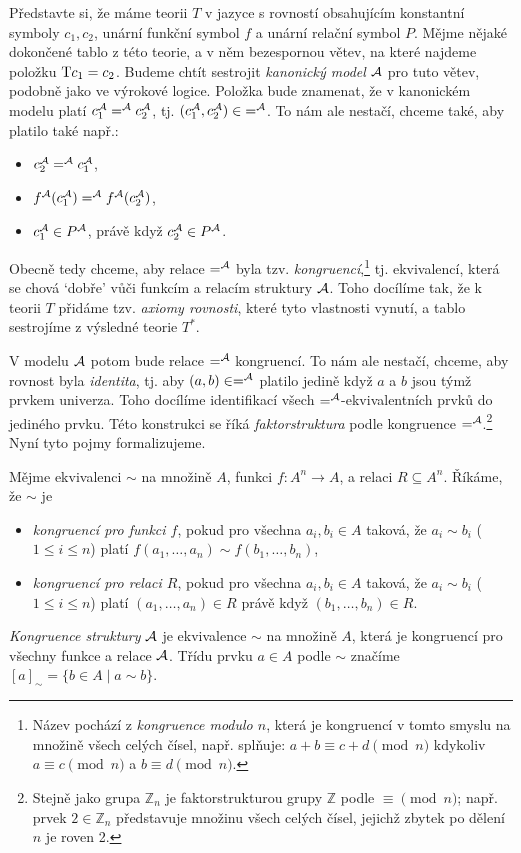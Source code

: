 Představte si, že máme teorii $T$ v jazyce s rovností obsahujícím konstantní symboly $c_1,c_2$, unární funkční symbol $f$ a unární relační symbol $P$. Mějme nějaké dokončené tablo z této teorie, a v něm bezespornou větev, na které najdeme položku $\mathrm{T} c_1=c_2$. Budeme chtít sestrojit \emph{kanonický model} $\mathcal{A}$ pro tuto větev, podobně jako ve výrokové logice. Položka bude znamenat, že v kanonickém modelu platí $c_1^{\mathcal{A}} =^{\mathcal{A}} c_2^{\mathcal{A}}$, tj. $(c_1^{\mathcal{A}},c_2^{\mathcal{A}})\in {=^{\mathcal{A}}}$. To nám ale nestačí, chceme také, aby platilo také např.:
\begin{itemize}
    \item $c_2^{\mathcal{A}} =^{\mathcal{A}} c_1^{\mathcal{A}}$,
    \item $f^{\mathcal{A}}(c_1^{\mathcal{A}}) =^{\mathcal{A}} f^{\mathcal{A}}(c_2^{\mathcal{A}})$,
    \item $c_1^{\mathcal{A}}\in P^{\mathcal{A}}$, právě když $c_2^{\mathcal{A}}\in P^{\mathcal{A}}$.
\end{itemize}
Obecně tedy chceme, aby relace $=^{\mathcal{A}}$ byla tzv. \emph{kongruencí},\footnote{Název pochází z \emph{kongruence modulo $n$}, která je kongruencí v tomto smyslu na množině všech celých čísel, např. splňuje: $a+b\equiv c+d\pmod n$ kdykoliv $a\equiv c\pmod n$ a $b\equiv d\pmod n$.} tj. ekvivalencí, která se chová `dobře' vůči funkcím a relacím struktury $\mathcal{A}$. Toho docílíme tak, že k teorii $T$ přidáme tzv. \emph{axiomy rovnosti}, které tyto vlastnosti vynutí, a tablo sestrojíme z výsledné teorie $T^*$.

V modelu $\mathcal{A}$ potom bude relace $=^{\mathcal{A}}$ kongruencí. To nám ale nestačí, chceme, aby rovnost byla \emph{identita}, tj. aby $(a,b)\in=^{\mathcal{A}}$ platilo jedině když $a$ a $b$ jsou týmž prvkem univerza. Toho docílíme identifikací všech $=^{\mathcal{A}}$-ekvivalentních prvků do jediného prvku. Této konstrukci se říká \emph{faktorstruktura} podle kongruence $=^{\mathcal{A}}$.\footnote{Stejně jako grupa $\mathbb Z_n$ je faktorstrukturou grupy $\mathbb Z$ podle $\equiv\pmod n$; např. prvek $2\in\mathbb Z_n$ představuje množinu všech celých čísel, jejichž zbytek po dělení $n$ je roven 2.} Nyní tyto pojmy formalizujeme.

\begin{definition}[Kongruence]
    Mějme ekvivalenci $\sim$ na množině $A$, funkci $f\colon A^n\to A$, a relaci $R\subseteq A^n$. Říkáme, že $\sim$ je
    \begin{itemize}
        \item \emph{kongruencí pro funkci $f$}, pokud pro všechna $a_i,b_i\in A$ taková, že $a_i\sim b_i$ ($1\leq i\leq n$) platí $f(a_1,\dots,a_n)\sim f(b_1,\dots,b_n)$,
        \item \emph{kongruencí pro relaci $R$}, pokud pro všechna $a_i,b_i\in A$ taková, že $a_i\sim b_i$ ($1\leq i\leq n$) platí $(a_1,\dots,a_n)\in R$ právě když $(b_1,\dots,b_n)\in R$.
    \end{itemize}    
    \emph{Kongruence struktury} $\mathcal{A}$ je ekvivalence $\sim$ na množině $A$, která je kongruencí pro všechny funkce a relace $\mathcal{A}$. Třídu prvku $a\in A$ podle $\sim$ značíme $[a]_\sim=\{b\in A\mid a\sim b\}$.
\end{definition}


